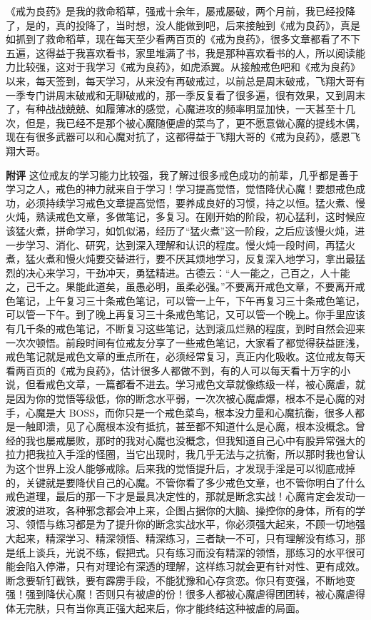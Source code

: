\begin{case}
    《戒为良药》是我的救命稻草，强戒十余年，屡戒屡破，两个月前，我已经投降了，是的，真的投降了，当时想，没人能做到吧，后来接触到《戒为良药》，真是如抓到了救命稻草，现在每天至少看两百页的《戒为良药》，很多文章都看了不下五遍，这得益于我喜欢看书，家里堆满了书，我是那种喜欢看书的人，所以阅读能力比较强，这对于我学习《戒为良药》，如虎添翼。从接触戒色吧和《戒为良药》以来，每天签到，每天学习，从来没有再破戒过，以前总是周末破戒，飞翔大哥有一季专门讲周末破戒和无聊破戒的，那一季反复看了很多遍，很有效果，又到周末了，有种战战兢兢、如履薄冰的感觉，心魔进攻的频率明显加快，一天甚至十几次，但是，我已经不是那个被心魔随便虐的菜鸟了，更不愿意做心魔的提线木偶，现在有很多武器可以和心魔对抗了，这都得益于飞翔大哥的《戒为良药》，感恩飞翔大哥。

    \textbf{附评} 这位戒友的学习能力比较强，我了解过很多戒色成功的前辈，几乎都是善于学习之人，戒色的神力就来自于学习！学习提高觉悟，觉悟降伏心魔！要想戒色成功，必须持续学习戒色文章提高觉悟，要养成良好的习惯，持之以恒。猛火煮、慢火炖，熟读戒色文章，多做笔记，多复习。在刚开始的阶段，初心猛利，这时候应该猛火煮，拼命学习，如饥似渴，经历了“猛火煮”这一阶段，之后应该慢火炖，进一步学习、消化、研究，达到深入理解和认识的程度。慢火炖一段时间，再猛火煮，猛火煮和慢火炖要交替进行，要不厌其烦地学习，反复深入地学习，拿出最猛烈的决心来学习，干劲冲天，勇猛精进。古德云：“人一能之，己百之，人十能之，己千之。果能此道矣，虽愚必明，虽柔必强。”不要离开戒色文章，不要离开戒色笔记，上午复习三十条戒色笔记，可以管一上午，下午再复习三十条戒色笔记，可以管一下午。到了晚上再复习三十条戒色笔记，又可以管一个晚上。你手里应该有几千条的戒色笔记，不断复习这些笔记，达到滚瓜烂熟的程度，到时自然会迎来一次次顿悟。前段时间有位戒友分享了一些戒色笔记，大家看了都觉得获益匪浅，戒色笔记就是戒色文章的重点所在，必须经常复习，真正内化吸收。这位戒友每天看两百页的《戒为良药》，估计很多人都做不到，有的人可以每天看十万字的小说，但看戒色文章，一篇都看不进去。学习戒色文章就像练级一样，被心魔虐，就是因为你的觉悟等级低，你的断念水平弱，一次次被心魔虐爆，根本不是心魔的对手，心魔是大 BOSS，而你只是一个戒色菜鸟，根本没力量和心魔抗衡，很多人都是一触即溃，见了心魔根本没有抵抗，甚至都不知道什么是心魔，根本没概念。曾经的我也屡戒屡败，那时的我对心魔也没概念，但我知道自己心中有股异常强大的拉力把我拉入手淫的怪圈，当它出现时，我几乎无法与之抗衡，所以那时我也曾认为这个世界上没人能够戒除。后来我的觉悟提升后，才发现手淫是可以彻底戒掉的，关键就是要降伏自己的心魔。不管你看了多少戒色文章，也不管你明白了什么戒色道理，最后的那一下才是最具决定性的，那就是断念实战！心魔肯定会发动一波波的进攻，各种邪念都会冲上来，企图占据你的大脑、操控你的身体，所有的学习、领悟与练习都是为了提升你的断念实战水平，你必须强大起来，不顾一切地强大起来，精深学习、精深领悟、精深练习，三者缺一不可，只有理解没有练习，那是纸上谈兵，光说不练，假把式。只有练习而没有精深的领悟，那练习的水平很可能会陷入停滞，只有对理论有深透的理解，这样练习就会更有针对性、更有成效。断念要斩钉截铁，要有霹雳手段，不能犹豫和心存贪恋。你只有变强，不断地变强！强到降伏心魔！否则只有被虐的份！很多人都被心魔虐得团团转，被心魔虐得体无完肤，只有当你真正强大起来后，你才能终结这种被虐的局面。
\end{case}


